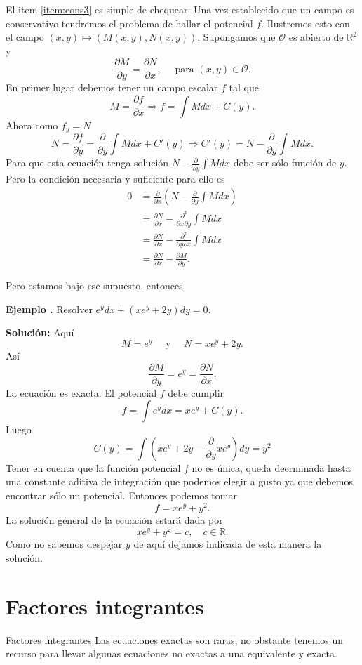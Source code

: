 \documentclass{article}
\newcommand{\rr}{\mathbb{R}}
\newcommand{\der}[2]{\frac{\partial #1}{\partial #2}}
\newcounter{ejemplo_cont}
\newenvironment{ejemplo}{\noindent\textbf{Ejemplo  \arabic{ejemplo_cont}.} }{\addtocounter{ejemplo_cont}{1}}
\begin{document}
El item \ref{item:cons3}  es simple de chequear. Una vez establecido que un campo es conservativo tendremos el problema de hallar el potencial $f$.
Ilustremos esto con el campo $(x,y)\mapsto (M(x,y),N(x,y))$. Supongamos que $\mathcal{O}$ es abierto de $\rr^2$ y
\[\frac{\partial M}{\partial y}=\frac{\partial N}{\partial x},\quad\text{ para } (x,y)\in \mathcal{O}.\] 
En primer lugar debemos tener un campo escalar $f$ tal que
\[M=\frac{\partial f}{\partial x}\Rightarrow f=\int Mdx +C(y).\]
Ahora como $f_y=N$
\[N=\frac{\partial f}{\partial y}=\frac{\partial}{\partial y}\int Mdx +C'(y)\Rightarrow C'(y)=N-\frac{\partial}{\partial y}\int Mdx .\]
 Para que esta ecuación tenga solución $N-\frac{\partial}{\partial y}\int Mdx$ debe ser sólo función de $y$. Pero la condición necesaria y suficiente para ello es 
\[\begin{split}0&=\frac{\partial}{\partial x}\left(N-\frac{\partial}{\partial y}\int Mdx\right)\\
&= \der{N}{x}-\frac{\partial^2}{\partial x\partial y}\int Mdx\\
&=\der{N}{x}-\frac{\partial^2}{\partial y\partial x}\int Mdx\\
&=\der{N}{x}-\der{M}{y}.
   \end{split}
\]

 Pero estamos bajo ese supuesto, entonces

\begin{ejemplo} Resolver $e^ydx+(xe^y+2y)dy=0$.
 \end{ejemplo}


\noindent\textbf{Solución:} Aquí
\[M=e^y\quad\text{ y }\quad N=xe^y+2y.\]
Así
\[\der{M}{y}=e^y=\der{N}{x}.\]
La ecuación es exacta. El potencial $f$ debe cumplir
\[f=\int e^ydx=xe^y+C(y).\]
Luego
\[C(y)=\int\left( xe^y+2y -\frac{\partial}{\partial y} xe^y\right)dy= y^2\]
Tener en cuenta que la función potencial $f$ no es única, queda deerminada hasta una constante aditiva de integración que podemos elegir a gusto ya que 
debemos encontrar sólo un potencial. Entonces podemos tomar
\[f= xe^y+y^2.\]
La solución general de la ecuación estará dada por
\[xe^y+y^2=c,\quad c\in\rr.\]
Como no sabemos despejar $\boxed{y}$ de aquí dejamos indicada de esta manera la solución.



\section{Factores integrantes}
{Factores integrantes}
 Las ecuaciones exactas son raras, no obstante tenemos un recurso para llevar algunas ecuaciones no exactas a una equivalente y exacta.
\end{document}
